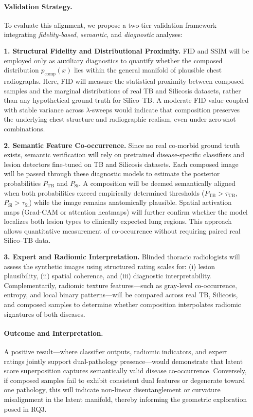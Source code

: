\paragraph{Validation Strategy.}
To evaluate this alignment, we propose a two-tier validation framework integrating \emph{fidelity-based}, \emph{semantic}, and \emph{diagnostic} analyses:

\textbf{1. Structural Fidelity and Distributional Proximity.}  
FID and SSIM will be employed only as auxiliary diagnostics to quantify whether the composed distribution $p_{\mathrm{comp}}(x)$ lies within the general manifold of plausible chest radiographs.  
Here, FID will measure the statistical proximity between composed samples and the marginal distributions of real TB and Silicosis datasets, rather than any hypothetical ground truth for Silico–TB.  
A moderate FID value coupled with stable variance across $\lambda$-sweeps would indicate that composition preserves the underlying chest structure and radiographic realism, even under zero-shot combinations.

\textbf{2. Semantic Feature Co-occurrence.}  
Since no real co-morbid ground truth exists, semantic verification will rely on pretrained disease-specific classifiers and lesion detectors fine-tuned on TB and Silicosis datasets.  
Each composed image will be passed through these diagnostic models to estimate the posterior probabilities $P_{\mathrm{TB}}$ and $P_{\mathrm{Si}}$.  
A composition will be deemed semantically aligned when both probabilities exceed empirically determined thresholds ($P_{\mathrm{TB}} > \tau_{\mathrm{TB}}$, $P_{\mathrm{Si}} > \tau_{\mathrm{Si}}$) while the image remains anatomically plausible.  
Spatial activation maps (Grad-CAM or attention heatmaps) will further confirm whether the model localizes both lesion types to clinically expected lung regions.  
This approach allows quantitative measurement of co-occurrence without requiring paired real Silico–TB data.

\textbf{3. Expert and Radiomic Interpretation.}  
Blinded thoracic radiologists will assess the synthetic images using structured rating scales for: (i) lesion plausibility, (ii) spatial coherence, and (iii) diagnostic interpretability.  
Complementarily, radiomic texture features—such as gray-level co-occurrence, entropy, and local binary patterns—will be compared across real TB, Silicosis, and composed samples to determine whether composition interpolates radiomic signatures of both diseases.

\paragraph{Outcome and Interpretation.}
A positive result—where classifier outputs, radiomic indicators, and expert ratings jointly support dual-pathology presence—would demonstrate that latent score superposition captures semantically valid disease co-occurrence.  
Conversely, if composed samples fail to exhibit consistent dual features or degenerate toward one pathology, this will indicate non-linear disentanglement or curvature misalignment in the latent manifold, thereby informing the geometric exploration posed in RQ3.


